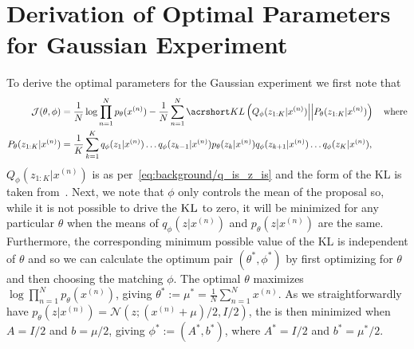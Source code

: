 
\vspace{-4pt}

\section{Derivation of Optimal Parameters for Gaussian Experiment}
\label{sec:optGauss}

\vspace{-4pt}

To derive the optimal parameters for the Gaussian experiment we first note that
\begin{align*}
\mathcal J(\theta, \phi) %
&= \frac{1}{N}\log \prod_{n=1}^{N} p_{\theta}(x^{(n)}) - \frac{1}{N}\sum_{n=1}^{N} \KL{Q_{\phi}(z_{1:K}|x^{(n)})}{P_{\theta}(z_{1:K}|x^{(n)})} \quad \text{where}\\
P_{\theta}(z_{1:K}|x^{(n)}) &= \frac{1}{K} \sum_{k=1}^{K}
q_{\phi} (z_1 | x^{(n)}) \dots q_{\phi} (z_{k-1} | x^{(n)}) p_{\theta} (z_k | x^{(n)}) 
q_{\phi} (z_{k+1} | x^{(n)}) \dots q_{\phi} (z_{K} | x^{(n)}),
\end{align*}
$Q_{\phi}(z_{1:K}|x^{(n)})$ is as per~\eqref{eq:background/q_is_z_is} 
 and the form of the \gls{KL} is taken from~\cite{le2017auto}.
Next, we note that $\phi$ only controls the mean of the proposal so, while it is not possible to drive the
$\textsc{KL}$ to zero, it will be minimized for any particular $\theta$ when the means of $q_{\phi}(z|x^{(n)})$
and $p_{\theta}(z|x^{(n)})$ are the same.  
Furthermore, the corresponding minimum possible value of the \textsc{KL} is independent of
$\theta$ and so we can
calculate the optimum pair $(\theta^*,\phi^*)$ by first optimizing for $\theta$ and then choosing the matching $\phi$.
The optimal $\theta$ maximizes $\log \prod_{n=1}^{N} p_{\theta}(x^{(n)})$, giving $\theta^* := \mu^* = \frac{1}{N} \sum_{n = 1}^N x^{(n)}$.
As we straightforwardly have $p_{\theta} (z | x^{(n)}) = 
\mathcal{N}(z; \left(x^{(n)}+\mu\right)/2, I/2)$, the  is then minimized
when $A=I/2$ and $b=\mu/2$, giving $\phi^* := (A^*, b^*)$, where $A^* = I / 2$ and $b^* = \mu^* / 2$.

\vspace{-4pt}